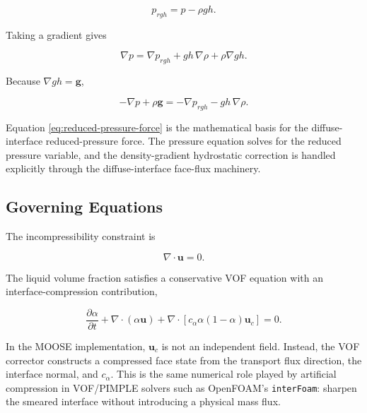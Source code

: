 \documentclass[11pt]{article}
\newcommand{\grad}{\nabla}
\newcommand{\divergence}{\nabla\!\cdot}
\begin{document}
\begin{equation}
  p_{rgh}=p-\rho gh.
  \label{eq:prgh}
\end{equation}

Taking a gradient gives

\begin{equation}
  \grad p
  =
  \grad p_{rgh}
  +
  gh\,\grad\rho
  +
  \rho\grad gh.
\end{equation}

Because \(\grad gh=\mathbf{g}\),

\begin{equation}
  -\grad p+\rho\mathbf{g}
  =
  -\grad p_{rgh}-gh\,\grad\rho.
  \label{eq:reduced-pressure-force}
\end{equation}

Equation \eqref{eq:reduced-pressure-force} is the mathematical basis for the
diffuse-interface reduced-pressure force.  The pressure equation solves for the
reduced pressure variable, and the density-gradient hydrostatic correction is
handled explicitly through the diffuse-interface face-flux machinery.

\subsection{Governing Equations}

The incompressibility constraint is

\begin{equation}
  \divergence\mathbf{u}=0.
  \label{eq:div-free}
\end{equation}

The liquid volume fraction satisfies a conservative VOF equation with an
interface-compression contribution,

\begin{equation}
  \frac{\partial\alpha}{\partial t}
  +
  \divergence(\alpha\mathbf{u})
  +
  \divergence\!\left[
    c_\alpha\alpha(1-\alpha)\mathbf{u}_c
  \right]
  =
  0.
  \label{eq:continuous-alpha}
\end{equation}

In the MOOSE implementation, \(\mathbf{u}_c\) is not an independent field.
Instead, the VOF corrector constructs a compressed face state from the transport
flux direction, the interface normal, and \(c_\alpha\).  This is the same
numerical role played by artificial compression in VOF/PIMPLE solvers such as
OpenFOAM's \texttt{interFoam}: sharpen the smeared interface without introducing
a physical mass flux.
\end{document}
